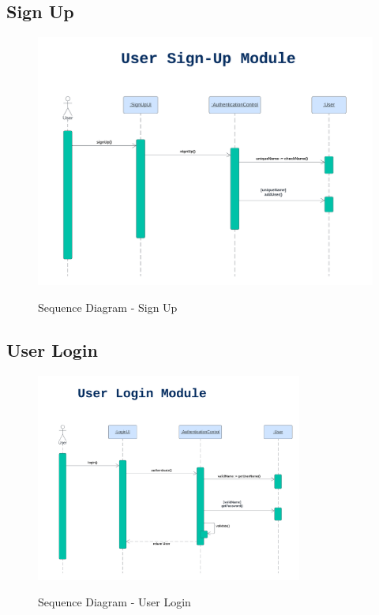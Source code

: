 \documentclass[12pt]{article}
\begin{document}
\subsection{Sign Up}
\begin{figure}[H]
    \centering
        \includegraphics[width=\textwidth]{Sequence Diagram/Signup.png}
        \label{fig:SeqSign}
    \caption{Sequence Diagram - Sign Up}
\end{figure}

\newpage
\subsection{User Login}
\begin{figure}[H]
    \centering
        \includegraphics[width=0.78\textwidth]{Sequence Diagram/Login.png}
        \label{fig:SeqLogin}
    \caption{Sequence Diagram - User Login}
\end{figure}
\end{document}
